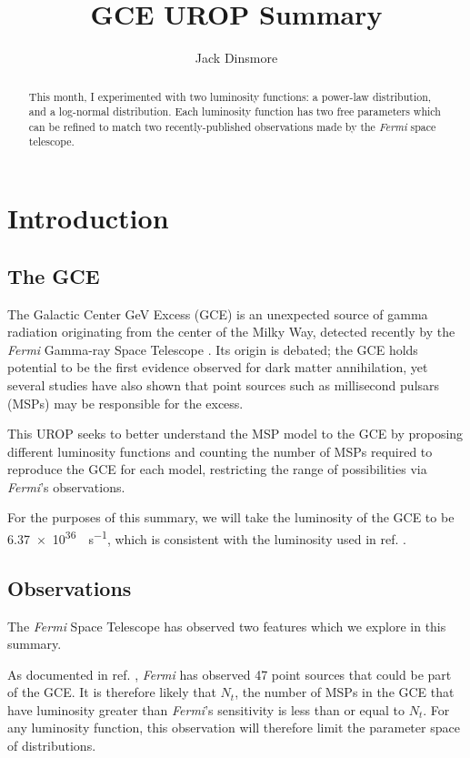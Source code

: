\documentclass{C://Aliases//Dropbox-MIT//Latex_Templates//personal}
\author{Jack Dinsmore}
\title{GCE UROP Summary}
\begin{document}
\maketitle

\begin{abstract}
This month, I experimented with two luminosity functions: a power-law distribution, and a log-normal distribution. Each luminosity function has two free parameters which can be refined to match two recently-published observations made by the \textit{Fermi} space telescope.
\end{abstract}


\section{Introduction}
\subsection{The GCE}
The Galactic Center GeV Excess (GCE) is an unexpected source of gamma radiation originating from the center of the Milky Way, detected  recently by the \textit{Fermi} Gamma-ray Space Telescope \cite{fermilab}. Its origin is debated; the GCE holds potential to be the first evidence observed for dark matter annihilation, yet several studies have also shown that point sources such as millisecond pulsars (MSPs) may be responsible for the excess.

This UROP seeks to better understand the MSP model to the GCE by proposing different luminosity functions and counting the number of MSPs required to reproduce the GCE for each model, restricting the range of possibilities via \textit{Fermi}'s observations.

For the purposes of this summary, we will take the luminosity of the GCE to be \SI{6.37e36}{\erg \per\second}, which is consistent with the luminosity used in ref. \cite{fermilab}.


\subsection{Observations}
The \textit{Fermi} Space Telescope has observed two features which we explore in this summary.

As documented in ref. \cite{fermilab}, \textit{Fermi} has observed 47 point sources that could be part of the GCE. It is therefore likely that $N_t$, the number of MSPs in the GCE that have luminosity greater than \textit{Fermi}'s sensitivity is less than or equal to $N_t$. For any luminosity function, this observation will therefore limit the parameter space of distributions.
\end{document}
